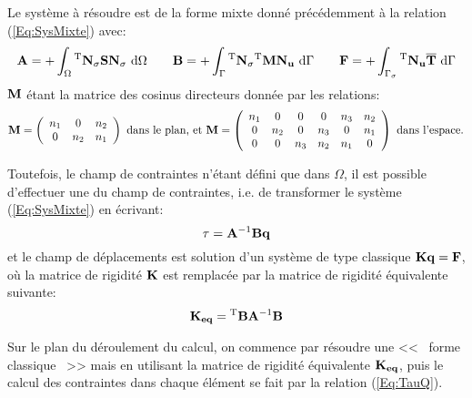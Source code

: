 \medskip
Le systè{}me à{} ré{}soudre est de la forme mixte donné{} précédemment à la relation (\ref{Eq:SysMixte})
avec:
\begin{equation}
   \mathbf{A} = +\displaystyle\int_{\Omega} {}^\mathrm{T}\mathbf{N_\sigma}\mathbf{S}\mathbf{N_\sigma}\ \text{d}\Omega
\qquad
   \mathbf{B} = +\displaystyle\int_{\Gamma} {}^\mathrm{T}\mathbf{N_\sigma}{}^\mathrm{T}\mathbf{M}\mathbf{N_u}\ \text{d}\Gamma
\qquad
   \mathbf{F} = +\displaystyle\int_{\Gamma_\sigma} {}^\mathrm{T}\mathbf{N_u}\mathbf{\overline{T}} \ \text{d}\Gamma
\end{equation}
$\mathbf{M}$ é{}tant la matrice des cosinus directeurs donné{}e
par les relations:
\begin{equation}
   \MM{M}=\MMM{\begin{array}{ccc}
                  n_1&  0&n_2\\
                    0&n_2&n_1
                \end{array}}
\text{ dans le plan, et }%
   \MM{M}=\MMM{\begin{array}{cccccc}
                  n_1&  0&  0&  0&n_3&n_2\\
                    0&n_2&  0&n_3&  0&n_1\\
                    0&  0&n_3&n_2&n_1&  0
                \end{array}}
\text{ dans l'espace.}
\end{equation}

\bigskip
Toutefois, le champ de contraintes n'é{}tant dé{}fini que dans $\Omega$,
il est possible d'effectuer une  du
champ de contraintes, i.e. de transformer le systè{}me
(\ref{Eq:SysMixte}) en é{}crivant:
\begin{equation}
   \label{Eq:TauQ}
      \mathbf{\tau} = \mathbf{A}^{-1}\mathbf{B}\mathbf{q}
\end{equation}
et le champ de dé{}placements est solution d'un systè{}me de type
classique $\mathbf{K}\mathbf{q}=\mathbf{F}$, où{} la matrice de rigidité $\mathbf{K}$ est remplacé{}e
par la matrice de rigidité{} é{}quivalente suivante:
\begin{equation}
   \mathbf{K_{eq}} = {}^\mathrm{T}\mathbf{B}\mathbf{A}^{-1}\mathbf{B}
\end{equation}


\medskip
Sur le plan du dé{}roulement du calcul, on commence par résoudre une <<~ forme classique ~>>
mais en utilisant la matrice de rigidité{} é{}quivalente $\mathbf{K_{eq}}$, puis le
calcul des contraintes dans chaque é{}lé{}ment se fait par la relation (\ref{Eq:TauQ}).


